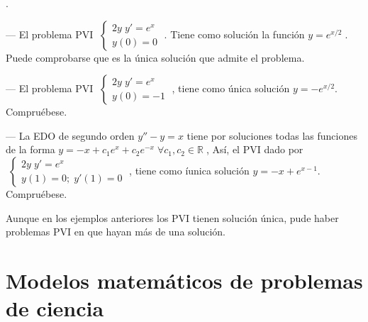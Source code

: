 \begin{cuadro-naranja}
\begin{ejem}.

--- El problema PVI $\; \begin{cases} 2y\; y'=e^x \\ y(0)=0 \end{cases}\; $. Tiene como solución la función $y=e^{x/2}\; $. Puede comprobarse que es la única solución que admite el problema.

--- El problema PVI $\; \begin{cases} 2y\; y'=e^x \\ y(0)=-1 \end{cases}\; $, tiene como única solución $y=-e^{x/2}$. Compruébese.

--- La EDO de segundo orden $y''-y=x$ tiene por soluciones todas las funciones de la forma $y=-x+c_1 e^x+c_2 e^{-x} \; \forall c_1, c_2 \in \mathbb R \; $, Así, el PVI dado por $\; \begin{cases} 2y \; y'=e^x \\ y(1)=0; \; y'(1)=0 \end{cases}\; $, tiene como íunica solución $y=-x+e^{x-1}$. Compruébese.

Aunque en los ejemplos anteriores los PVI tienen solución única, pude haber problemas PVI en que hayan más de una solución.
\end{ejem}
\end{cuadro-naranja}

\vspace{5mm}
\section{Modelos matemáticos de problemas de ciencia}

